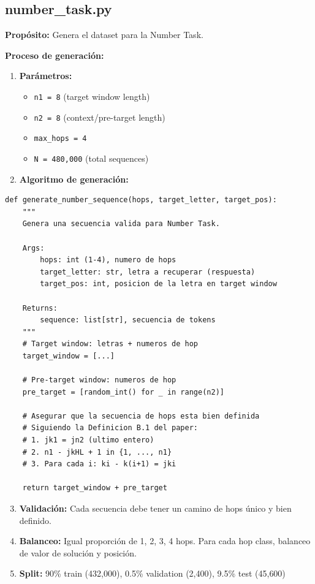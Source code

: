 \documentclass[12pt,a4paper]{report}
\begin{document}
\subsection{number\_task.py}
\label{subsec:number_task}

\textbf{Propósito:} Genera el dataset para la Number Task.

\textbf{Proceso de generación:}

\begin{enumerate}
  \item \textbf{Parámetros:}
  \begin{itemize}
    \item \texttt{n1 = 8} (target window length)
    \item \texttt{n2 = 8} (context/pre-target length)
    \item \texttt{max\_hops = 4}
    \item \texttt{N = 480{,}000} (total sequences)
  \end{itemize}

  \item \textbf{Algoritmo de generación:}
\end{enumerate}

\begin{lstlisting}
def generate_number_sequence(hops, target_letter, target_pos):
    """
    Genera una secuencia valida para Number Task.
    
    Args:
        hops: int (1-4), numero de hops
        target_letter: str, letra a recuperar (respuesta)
        target_pos: int, posicion de la letra en target window
    
    Returns:
        sequence: list[str], secuencia de tokens
    """
    # Target window: letras + numeros de hop
    target_window = [...]

    # Pre-target window: numeros de hop
    pre_target = [random_int() for _ in range(n2)]

    # Asegurar que la secuencia de hops esta bien definida
    # Siguiendo la Definicion B.1 del paper:
    # 1. jk1 = jn2 (ultimo entero)
    # 2. n1 - jkHL + 1 in {1, ..., n1}
    # 3. Para cada i: ki - k(i+1) = jki

    return target_window + pre_target
\end{lstlisting}

\begin{enumerate}
  \setcounter{enumi}{2}
  \item \textbf{Validación:} Cada secuencia debe tener un camino de hops único y bien definido.
  \item \textbf{Balanceo:} Igual proporción de 1, 2, 3, 4 hops. Para cada hop class, balanceo de valor de solución y posición.
  \item \textbf{Split:} 90\% train (432{,}000), 0.5\% validation (2{,}400), 9.5\% test (45{,}600)
\end{enumerate}
\end{document}
